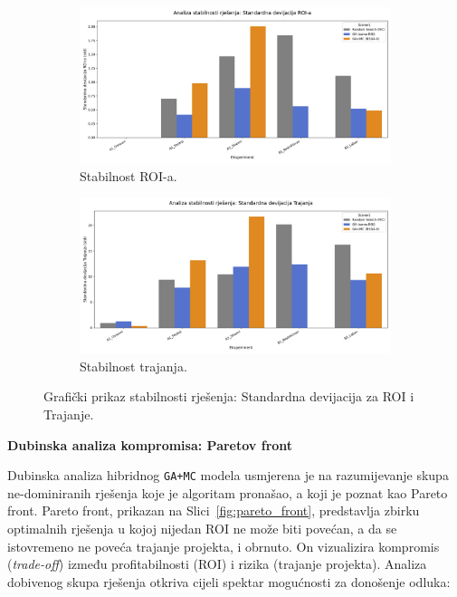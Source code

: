 \begin{figure}[H]
    \centering
    \begin{subfigure}[b]{0.48\textwidth}
        \centering
        \includegraphics[width=\textwidth]{slike/grafikoni_final/C_stabilnost_roi.png}
        \caption{Stabilnost ROI-a.}
    \end{subfigure}
    \hfill
    \begin{subfigure}[b]{0.48\textwidth}
        \centering
        \includegraphics[width=\textwidth]{slike/grafikoni_final/C_stabilnost_trajanje.png}
        \caption{Stabilnost trajanja.}
    \end{subfigure}
    \caption{Grafički prikaz stabilnosti rješenja: Standardna devijacija za ROI i Trajanje.}
    \label{fig:stabilnost}
\end{figure}

\textbf{Dubinska analiza kompromisa: Paretov front}

Dubinska analiza hibridnog \texttt{GA+MC} modela usmjerena je na razumijevanje skupa ne-dominiranih rješenja koje je algoritam pronašao, a koji je poznat kao Pareto front. Pareto front, prikazan na Slici~\ref{fig:pareto_front}, predstavlja zbirku optimalnih rješenja u kojoj nijedan ROI ne može biti povećan, a da se istovremeno ne poveća trajanje projekta, i obrnuto. On vizualizira kompromis (\textit{trade-off}) između profitabilnosti (ROI) i rizika (trajanje projekta).
Analiza dobivenog skupa rješenja otkriva cijeli spektar mogućnosti za donošenje odluka:


